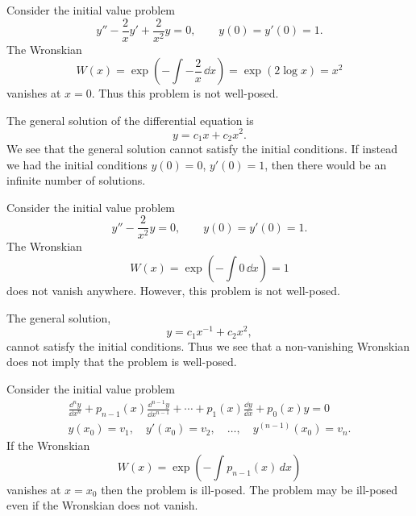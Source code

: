 \begin{Example}
  Consider the initial value problem
  \[ y'' - \frac{2}{x} y' + \frac{2}{x^2}y = 0, \qquad y(0) = y'(0) = 1.\]
  The Wronskian 
  \[ W(x) = \exp\left(-\int -\frac{2}{x}\,\dd x \right)
  = \exp\left(2 \log x \right)
  = x^2 \]
  vanishes at $x = 0$.  Thus this problem is not well-posed.  

  The general solution of the differential equation is
  \[ y = c_1 x + c_2 x^2.\]
  We see that the general solution cannot satisfy the initial conditions.
  If instead we had the initial conditions $y(0) = 0$, $y'(0) = 1$,
  then there would be an infinite number of solutions.
\end{Example}





\begin{Example}
  Consider the initial value problem
  \[ y'' - \frac{2}{x^2}y = 0, \qquad y(0) = y'(0) = 1.\]
  The Wronskian
  \[W(x) = \exp \left(- \int 0\,\dd x \right) = 1\]
  does not vanish anywhere.  However, this problem is not well-posed.

  The general solution,
  \[ y = c_1 x^{-1} + c_2 x^2,\]
  cannot satisfy the initial conditions.  Thus we see that a non-vanishing
  Wronskian does not imply that the problem is well-posed.
\end{Example}








\begin{Result}
  Consider the initial value problem
  \begin{gather*}
    \frac{\dd^n y}{\dd x^n} + p_{n-1}(x) \frac{\dd^{n-1}y}{\dd x^{n-1}} + \cdots
    + p_1(x) \frac{\dd y}{\dd x} + p_0(x) y = 0 \\
    y(x_0) = v_1, \quad y'(x_0) = v_2, \quad \ldots, \quad y^{(n-1)}(x_0) = v_n.
  \end{gather*}
  If the Wronskian 
  \[ 
  W(x) = \exp \left( - \int p_{n-1}(x)\,d x \right)
  \]
  vanishes at $x=x_0$ then the problem is ill-posed.  
  The problem may be ill-posed even if the Wronskian does not vanish.
\end{Result}












